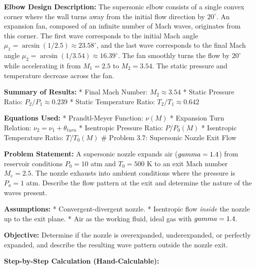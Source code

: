 \textbf{Elbow Design Description:} The supersonic elbow consists of a
single convex corner where the wall turns away from the initial flow
direction by \(20^\circ\). An expansion fan, composed of an infinite
number of Mach waves, originates from this corner. The first wave
corresponds to the initial Mach angle
\(\mu_1 = \arcsin(1/2.5) \approx 23.58^\circ\), and the last wave
corresponds to the final Mach angle
\(\mu_2 = \arcsin(1/3.54) \approx 16.39^\circ\). The fan smoothly turns
the flow by \(20^\circ\) while accelerating it from \(M_1=2.5\) to
\(M_2=3.54\). The static pressure and temperature decrease across the
fan.

\textbf{Summary of Results:} * Final Mach Number:
\(M_2 \approx \mathbf{3.54}\) * Static Pressure Ratio:
\(P_2/P_1 \approx \mathbf{0.239}\) * Static Temperature Ratio:
\(T_2/T_1 \approx \mathbf{0.642}\)

\textbf{Equations Used:} * Prandtl-Meyer Function: \(\nu(M)\) *
Expansion Turn Relation: \(\nu_2 = \nu_1 + \theta_{turn}\) * Isentropic
Pressure Ratio: \(P/P_0(M)\) * Isentropic Temperature Ratio:
\(T/T_0(M)\) \# Problem 3.7: Supersonic Nozzle Exit Flow

\textbf{Problem Statement:} A supersonic nozzle expands air
(\(\\gamma=1.4\)) from reservoir conditions \(P_0=10\) atm and
\(T_0=500\) K to an exit Mach number \(M_e=2.5\). The nozzle exhausts
into ambient conditions where the pressure is \(P_a=1\) atm. Describe
the flow pattern at the exit and determine the nature of the waves
present.

\textbf{Assumptions:} * Convergent-divergent nozzle. * Isentropic flow
\emph{inside} the nozzle up to the exit plane. * Air as the working
fluid, ideal gas with \(\\gamma = 1.4\).

\textbf{Objective:} Determine if the nozzle is overexpanded,
underexpanded, or perfectly expanded, and describe the resulting wave
pattern outside the nozzle exit.

\textbf{Step-by-Step Calculation (Hand-Calculable):}

